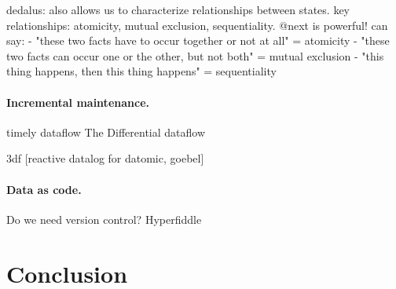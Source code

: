dedalus: also allows us to characterize relationships between states.
key relationships: atomicity, mutual exclusion, sequentiality.
@next is powerful! can say:
- "these two facts have to occur together or not at all" = atomicity
- "these two facts can occur one or the other, but not both" = mutual exclusion
- "this thing happens, then this thing happens" = sequentiality


\paragraph{Incremental maintenance.}

\cite{green2013datalog}
timely dataflow \cite{murray2013naiad}
The Differential dataflow \cite{mcsherry2013differential}

3df [reactive datalog for datomic, goebel] \cite{gobel2019optimising}


\paragraph{Data as code.}
Do we need version control?
Hyperfiddle \cite{getz18hyperfiddle}


\cleardoublepage
\section{Conclusion}
